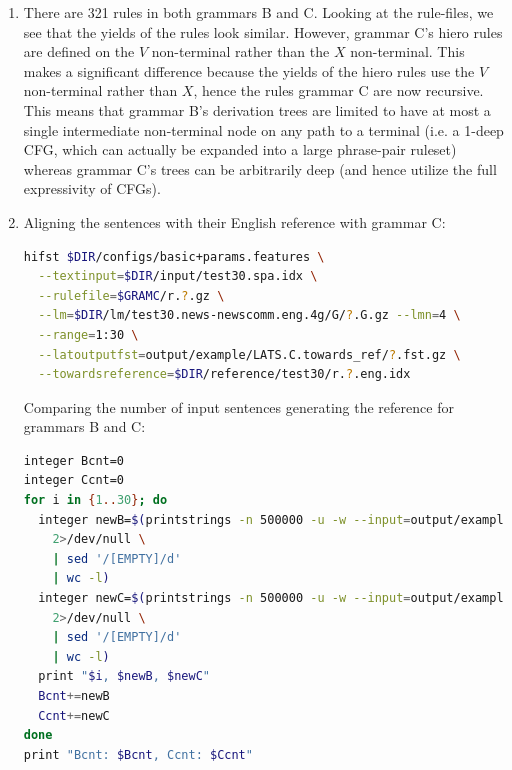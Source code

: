 \documentclass[a4paper,oneside,reqno]{amsart}
\begin{document}
\begin{enumerate}[label=\arabic*.]
  \item There are 321 rules in both grammars B and C. Looking at the
    rule-files, we see that the yields of the rules look similar. However,
    grammar C's hiero rules are defined on the $V$ non-terminal rather than the
    $X$ non-terminal. This makes a significant difference because the yields of
    the hiero rules use the $V$ non-terminal rather than $X$, hence the rules
    grammar C are now recursive. This means that grammar B's derivation trees
    are limited to have at most a single intermediate non-terminal node on any
    path to a terminal (i.e. a 1-deep CFG, which can actually be expanded into
    a large phrase-pair ruleset) whereas grammar C's trees can be arbitrarily
    deep (and hence utilize the full expressivity of CFGs).

  \item
    Aligning the sentences with their English reference with grammar C:
    \begin{lstlisting}[language=bash]
hifst $DIR/configs/basic+params.features \
  --textinput=$DIR/input/test30.spa.idx \
  --rulefile=$GRAMC/r.?.gz \
  --lm=$DIR/lm/test30.news-newscomm.eng.4g/G/?.G.gz --lmn=4 \
  --range=1:30 \
  --latoutputfst=output/example/LATS.C.towards_ref/?.fst.gz \
  --towardsreference=$DIR/reference/test30/r.?.eng.idx
    \end{lstlisting}

    Comparing the number of input sentences generating the reference
    for grammars B and C:
    \begin{lstlisting}[language=bash]
integer Bcnt=0
integer Ccnt=0
for i in {1..30}; do
  integer newB=$(printstrings -n 500000 -u -w --input=output/example/LATS.B.towards_ref/$i.fst.gz \
    2>/dev/null \
    | sed '/[EMPTY]/d'
    | wc -l)
  integer newC=$(printstrings -n 500000 -u -w --input=output/example/LATS.C.towards_ref/$i.fst.gz \
    2>/dev/null \
    | sed '/[EMPTY]/d'
    | wc -l)
  print "$i, $newB, $newC"
  Bcnt+=newB
  Ccnt+=newC
done
print "Bcnt: $Bcnt, Ccnt: $Ccnt"
    \end{lstlisting}


\end{enumerate}
\end{document}
